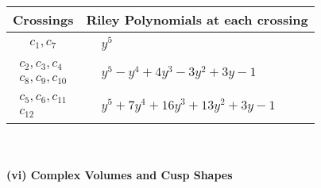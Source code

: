 \documentclass[1p]{elsarticle_modified}
\theoremstyle{definition}
\begin{document}
\begin{tabular}{m{50pt}|m{274pt}}
Crossings & \hspace{64pt}Riley Polynomials at each crossing \\
\hline $$\begin{aligned}c_{1},c_{7}\end{aligned}$$&$\begin{aligned}
&y^5
\end{aligned}$\\
\hline $$\begin{aligned}c_{2},c_{3},c_{4}\\c_{8},c_{9},c_{10}\end{aligned}$$&$\begin{aligned}
&y^5- y^4+4 y^3-3 y^2+3 y-1
\end{aligned}$\\
\hline $$\begin{aligned}c_{5},c_{6},c_{11}\\c_{12}\end{aligned}$$&$\begin{aligned}
&y^5+7 y^4+16 y^3+13 y^2+3 y-1
\end{aligned}$\\
\hline
\end{tabular}\\~\\
\newpage\flushleft \textbf{(vi) Complex Volumes and Cusp Shapes}
\end{document}
